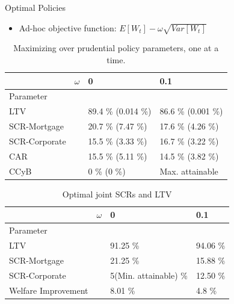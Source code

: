 \documentclass[8pt,aspectratio=169]{beamer}
\numberwithin{equation}{section}
\begin{document}
\begin{frame}{Optimal Policies}

\begin{itemize}
\item Ad-hoc objective function: $  E[W_t] - \omega \sqrt{Var[W_t]}  $
\end{itemize}

\begin{table}[h]

\caption{Maximizing over prudential policy parameters, one at a time.}
\begin{tabular}{l|l|l|l}

 & $\omega$ & 0 & 0.1   \\
 \hline
 \hline
Parameter & & &  \\
\hline
\hline
LTV &  & 89.4 \% (0.014 \%) & 86.6 \% (0.001 \%)  \\

SCR-Mortgage &  & 20.7 \% (7.47 \%) & 17.6 \% (4.26 \%) \\

SCR-Corporate & & 15.5 \% (3.33 \%) & 16.7 \% (3.22 \%) \\

CAR & & 15.5 \% (5.11 \%) & 14.5 \% (3.82 \%) \\

CCyB & & 0 \% (0 \%) & Max. attainable \\

\end{tabular}
\end{table}



\begin{table}[h]

\caption{Optimal joint SCRs and LTV}
\begin{tabular}{l|l|l|l}

 & $\omega$ & 0 & 0.1   \\
 \hline
 \hline
Parameter & & &  \\
\hline
\hline
LTV &  & 91.25 \%   &  94.06 \%  \\

SCR-Mortgage &  & 21.25 \%     & 15.88 \%   \\

SCR-Corporate & &  5(Min. attainable) \%  & 12.50 \%  \\

Welfare Improvement & & 8.01 \% & 4.8 \% \\

\end{tabular}
\end{table}



\end{frame}
\end{document}
